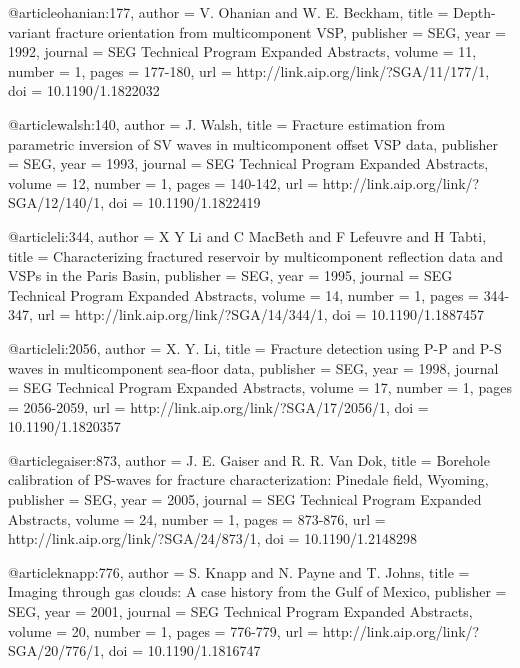 @article{ohanian:177,
  author =	 {V. Ohanian and W. E. Beckham},
  title =	 {Depth-variant fracture orientation from
                  multicomponent VSP},
  publisher =	 {SEG},
  year =	 1992,
  journal =	 {SEG Technical Program Expanded Abstracts},
  volume =	 11,
  number =	 1,
  pages =	 {177-180},
  url =		 {http://link.aip.org/link/?SGA/11/177/1},
  doi =		 {10.1190/1.1822032}
}

@article{walsh:140,
  author =	 {J. Walsh},
  title =	 {Fracture estimation from parametric inversion of
                  {SV} waves in multicomponent offset VSP data},
  publisher =	 {SEG},
  year =	 1993,
  journal =	 {SEG Technical Program Expanded Abstracts},
  volume =	 12,
  number =	 1,
  pages =	 {140-142},
  url =		 {http://link.aip.org/link/?SGA/12/140/1},
  doi =		 {10.1190/1.1822419}
}

@article{li:344,
  author =	 {X Y Li and C MacBeth and F
                  Lefeuvre and H Tabti},
  title =	 {Characterizing fractured reservoir by multicomponent
                  reflection data and {VSP}s in the Paris Basin},
  publisher =	 {SEG},
  year =	 1995,
  journal =	 {SEG Technical Program Expanded Abstracts},
  volume =	 14,
  number =	 1,
  pages =	 {344-347},
  url =		 {http://link.aip.org/link/?SGA/14/344/1},
  doi =		 {10.1190/1.1887457}
}

@article{li:2056,
  author =	 {X. Y. Li},
  title =	 {Fracture detection using {P}-{P} and {P}-{S} waves
                  in multicomponent sea-floor data},
  publisher =	 {SEG},
  year =	 1998,
  journal =	 {SEG Technical Program Expanded Abstracts},
  volume =	 17,
  number =	 1,
  pages =	 {2056-2059},
  url =		 {http://link.aip.org/link/?SGA/17/2056/1},
  doi =		 {10.1190/1.1820357}
}

@article{gaiser:873,
  author =	 {J. E. Gaiser and R. R. Van Dok},
  title =	 {Borehole calibration of PS-waves for fracture
                  characterization: Pinedale field, Wyoming},
  publisher =	 {SEG},
  year =	 2005,
  journal =	 {SEG Technical Program Expanded Abstracts},
  volume =	 24,
  number =	 1,
  pages =	 {873-876},
  url =		 {http://link.aip.org/link/?SGA/24/873/1},
  doi =		 {10.1190/1.2148298}
}

@article{knapp:776,
  author =	 {S. Knapp and N. Payne and T. Johns},
  title =	 {Imaging through gas clouds: A case history from the
                  Gulf of Mexico},
  publisher =	 {SEG},
  year =	 2001,
  journal =	 {SEG Technical Program Expanded Abstracts},
  volume =	 20,
  number =	 1,
  pages =	 {776-779},
  url =		 {http://link.aip.org/link/?SGA/20/776/1},
  doi =		 {10.1190/1.1816747}
}

